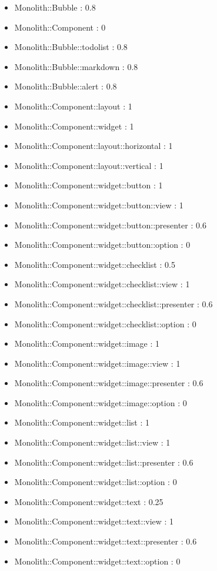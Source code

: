 \begin{itemize}
\item Monolith::Bubble : 0.8
\item Monolith::Component : 0
\item Monolith::Bubble::todolist : 0.8
\item Monolith::Bubble::markdown : 0.8
\item Monolith::Bubble::alert : 0.8
\item Monolith::Component::layout : 1
\item Monolith::Component::widget : 1
\item Monolith::Component::layout::horizontal : 1
\item Monolith::Component::layout::vertical : 1
\item Monolith::Component::widget::button : 1
\item Monolith::Component::widget::button::view : 1
\item Monolith::Component::widget::button::presenter : 0.6
\item Monolith::Component::widget::button::option : 0
\item Monolith::Component::widget::checklist : 0.5
\item Monolith::Component::widget::checklist::view : 1
\item Monolith::Component::widget::checklist::presenter : 0.6
\item Monolith::Component::widget::checklist::option : 0
\item Monolith::Component::widget::image : 1
\item Monolith::Component::widget::image::view : 1
\item Monolith::Component::widget::image::presenter : 0.6
\item Monolith::Component::widget::image::option : 0
\item Monolith::Component::widget::list : 1
\item Monolith::Component::widget::list::view : 1
\item Monolith::Component::widget::list::presenter : 0.6
\item Monolith::Component::widget::list::option : 0
\item Monolith::Component::widget::text : 0.25
\item Monolith::Component::widget::text::view : 1
\item Monolith::Component::widget::text::presenter : 0.6
\item Monolith::Component::widget::text::option : 0
\end{itemize}

